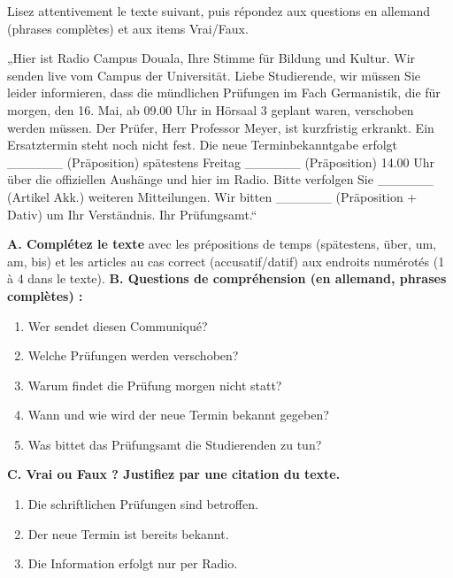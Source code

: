 \documentclass[11pt]{article}
\begin{document}
\begin{exercice}
Lisez attentivement le texte suivant, puis répondez aux questions en allemand (phrases complètes) et aux items Vrai/Faux.
\begin{textebox}
„Hier ist Radio Campus Douala, Ihre Stimme für Bildung und Kultur. Wir senden live vom Campus der Universität. Liebe Studierende, wir müssen Sie leider informieren, dass die mündlichen Prüfungen im Fach Germanistik, die für morgen, den 16. Mai, ab 09.00 Uhr in Hörsaal 3 geplant waren, verschoben werden müssen. Der Prüfer, Herr Professor Meyer, ist kurzfristig erkrankt. Ein Ersatztermin steht noch nicht fest. Die neue Terminbekanntgabe erfolgt \_\_\_\_\_\_ (Präposition) spätestens Freitag \_\_\_\_\_\_ (Präposition) 14.00 Uhr über die offiziellen Aushänge und hier im Radio. Bitte verfolgen Sie \_\_\_\_\_\_ (Artikel Akk.) weiteren Mitteilungen. Wir bitten \_\_\_\_\_\_ (Präposition + Dativ) um Ihr Verständnis. Ihr Prüfungsamt.“
\end{textebox}
\textbf{A. Complétez le texte} avec les prépositions de temps (spätestens, über, um, am, bis) et les articles au cas correct (accusatif/datif) aux endroits numérotés (1 à 4 dans le texte).
\textbf{B. Questions de compréhension (en allemand, phrases complètes) :}
\begin{enumerate}
\item Wer sendet diesen Communiqué?
\item Welche Prüfungen werden verschoben?
\item Warum findet die Prüfung morgen nicht statt?
\item Wann und wie wird der neue Termin bekannt gegeben?
\item Was bittet das Prüfungsamt die Studierenden zu tun?
\end{enumerate}
\textbf{C. Vrai ou Faux ? Justifiez par une citation du texte.}
\begin{enumerate}
\item Die schriftlichen Prüfungen sind betroffen.
\item Der neue Termin ist bereits bekannt.
\item Die Information erfolgt nur per Radio.
\end{enumerate}
\end{exercice}
\end{document}

